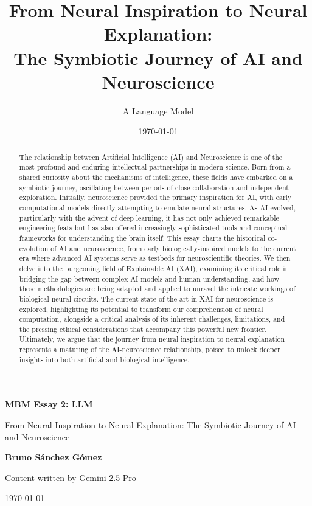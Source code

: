 \documentclass[11pt,a4paper]{article}
\title{From Neural Inspiration to Neural Explanation: \\ The Symbiotic Journey of AI and Neuroscience}
\author{A Language Model}
\date{\today}
\begin{document}
\begin{titlepage}
    \centering
    \vspace*{2cm}
    {\Huge \bfseries MBM Essay 2: LLM \par}
    \vspace{2cm}
    {\huge From Neural Inspiration to Neural Explanation: The Symbiotic Journey of AI and Neuroscience \par}
    \vspace{10cm}
    {\large \textbf{Bruno Sánchez Gómez} \par}
    {\large Content written by Gemini 2.5 Pro \par}
    \vfill
    {\large \today \par}
\end{titlepage}

\maketitle
\begin{abstract}
The relationship between Artificial Intelligence (AI) and Neuroscience is one of the most profound and enduring intellectual partnerships in modern science. Born from a shared curiosity about the mechanisms of intelligence, these fields have embarked on a symbiotic journey, oscillating between periods of close collaboration and independent exploration. Initially, neuroscience provided the primary inspiration for AI, with early computational models directly attempting to emulate neural structures. As AI evolved, particularly with the advent of deep learning, it has not only achieved remarkable engineering feats but has also offered increasingly sophisticated tools and conceptual frameworks for understanding the brain itself. This essay charts the historical co-evolution of AI and neuroscience, from early biologically-inspired models to the current era where advanced AI systems serve as testbeds for neuroscientific theories. We then delve into the burgeoning field of Explainable AI (XAI), examining its critical role in bridging the gap between complex AI models and human understanding, and how these methodologies are being adapted and applied to unravel the intricate workings of biological neural circuits. The current state-of-the-art in XAI for neuroscience is explored, highlighting its potential to transform our comprehension of neural computation, alongside a critical analysis of its inherent challenges, limitations, and the pressing ethical considerations that accompany this powerful new frontier. Ultimately, we argue that the journey from neural inspiration to neural explanation represents a maturing of the AI-neuroscience relationship, poised to unlock deeper insights into both artificial and biological intelligence.
\end{abstract}
\end{document}
